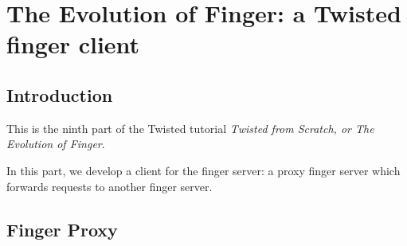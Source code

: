 \section{The Evolution of Finger: a Twisted finger client\label{doc/howto/tutorial/client.xhtml}}


\subsection{Introduction}


 This is the ninth part of the Twisted tutorial \textit{Twisted from Scratch, or The Evolution of Finger}.

In this part, we develop a client for the finger server: a proxy finger server which forwards requests to another finger server.

\subsection{Finger Proxy}


